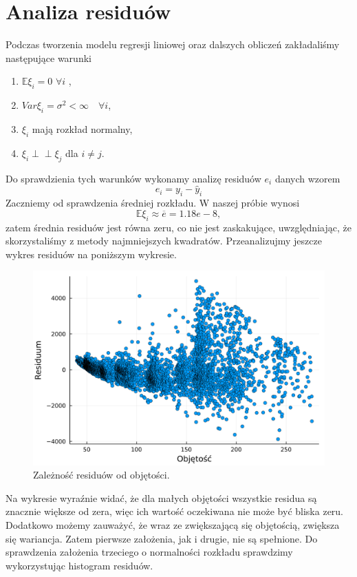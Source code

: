 \documentclass[12pt,leqno]{article}
\theoremstyle{exer}
\begin{document}
 \section{Analiza residuów}
 	Podczas tworzenia modelu regresji liniowej oraz dalszych obliczeń zakładaliśmy następujące warunki
 	\begin{enumerate}
 		\item $\mathbb{E}\xi_i=0$ $\forall i$ ,
 		\item $Var\xi_i=\sigma^2<\infty\quad\forall i$,
 		\item $\xi_i$ mają rozkład normalny,
 		\item $\xi_i\perp\!\!\!\perp\xi_j$ dla $i\neq j$.
 	\end{enumerate}
 	Do sprawdzienia tych warunków wykonamy analizę residuów $e_i$ danych wzorem
 	\begin{equation}
 		e_i=y_i-\hat y_i
 	\end{equation}
    Zaczniemy od sprawdzenia średniej rozkładu. W naszej próbie wynosi
	\begin{equation}
		\mathbb{E}\xi_i\approx\overline{e}=1.18e-8,
	\end{equation}
	zatem średnia residuów jest równa zeru, co nie jest zaskakujące, uwzględniając, że skorzystaliśmy z metody najmniejszych kwadratów. Przeanalizujmy jeszcze wykres residuów na poniższym wykresie.
	\begin{figure}[h]
		\centering
		\includegraphics[width=4\columnwidth/5]{images/Budnik/res_V.png}
		\caption{Zależność residuów od objętości.}
	\end{figure}
	Na wykresie wyraźnie widać, że dla małych objętości wszystkie residua są znacznie większe od zera, więc ich wartość oczekiwana nie może być bliska zeru. Dodatkowo możemy zauważyć, że wraz ze zwiększającą się objętością, zwiększa się wariancja. Zatem pierwsze założenia, jak i drugie, nie są spełnione. Do sprawdzenia założenia trzeciego o normalności rozkładu sprawdzimy wykorzystując histogram residuów.
\end{document}
